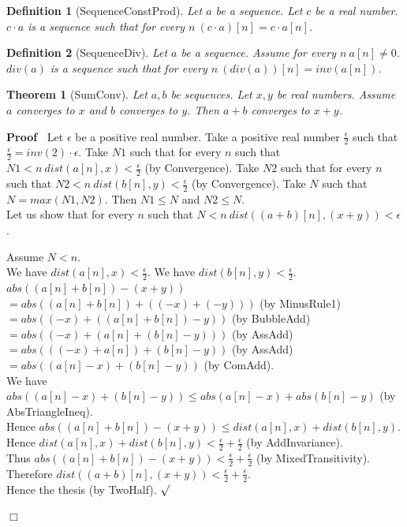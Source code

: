 \documentclass{article}
\newenvironment{forthel}{\begin{leftbar}}{\end{leftbar}}
\newenvironment{proof}{\noindent\textbf{Proof\ }}{\hspace*{\fill}$\Box$\medskip}
\newenvironment{subproof}{\begin{list}{}{}
		\item[\text{Proof}]}{\hfill $\surd$ \end{list}}
\newtheorem{theorem}{Theorem}
\newtheorem{definition}{Definition}
\newcommand{\cdottwo}{\cdot}
\newcommand{\plusone}{+}
\newcommand{\halfeps}{\frac{\epsilon}{2}}
\newcommand{\dotequal}{=}
\begin{document}
\begin{forthel}
	\begin{definition}[SequenceConstProd]
	Let $a$ be a sequence. Let $c$ be a real number. $c \cdottwo a$ is a sequence such that for every $n \ (c \cdottwo a)[n] = c \cdot a[n]$.
	\end{definition}

	\begin{definition}[SequenceDiv]
	Let $a$ be a sequence. Assume for every $n \ a[n] \neq 0$. $div(a)$ is a sequence such that for every $n \ (div(a))[n] = inv(a[n])$.
	\end{definition}
	
	\begin{theorem}[SumConv]
	Let $a,b$ be sequences. Let $x,y$ be real numbers. Assume $a$ converges to $x$ and $b$ converges to $y$.
	Then $a \plusone b$ converges to $x + y$.
	\end{theorem}
	\begin{proof}
	Let $\epsilon$ be a positive real number.
	Take a positive real number $\halfeps$ such that $\halfeps = inv(2) \cdot \epsilon$.
	Take $N1$ such that for every $n$ such that $N1 < n \ dist(a[n],x) < \halfeps$ (by Convergence).
	Take $N2$ such that for every $n$ such that $N2 < n \ dist(b[n],y) < \halfeps$ (by Convergence).
	Take $N$ such that $N = max(N1,N2)$.
	Then $N1 \leq N$ and $N2 \leq N$.
	\\Let us show that for every $n$ such that $N < n \ dist((a \plusone b)[n],(x+y)) < \epsilon$.
	\begin{subproof}
	Assume $N < n$.
	\\We have $dist(a[n],x) < \halfeps$.
	We have $dist(b[n],y) < \halfeps$.
	\\$abs((a[n] + b[n]) - (x + y))$ 
	\\$\dotequal abs((a[n] + b[n]) + ((-x) + (-y)))$ (by MinusRule1)
	\\$\dotequal abs((-x) + ((a[n] + b[n]) - y))$ (by BubbleAdd)
	\\$\dotequal abs((-x) + (a[n] + (b[n] - y)))$ (by AssAdd)
	\\$\dotequal abs(((-x) + a[n]) + (b[n] - y))$ (by AssAdd)
	\\$\dotequal abs((a[n] - x) + (b[n] - y))$ (by ComAdd).
	\\We have $abs((a[n] - x) + (b[n] - y)) \leq abs(a[n] - x) + abs(b[n] - y)$  (by AbsTriangleIneq).
	\\Hence $abs((a[n] + b[n]) - (x + y)) \leq dist(a[n],x) + dist(b[n],y)$.
	\\Hence $dist(a[n],x) + dist(b[n],y) < \halfeps + \halfeps$ (by AddInvariance).
	\\Thus $abs((a[n] + b[n]) - (x + y)) < \halfeps + \halfeps$ (by MixedTransitivity).
	\\Therefore $dist((a \plusone b)[n],(x + y)) < \halfeps + \halfeps$.
	\\Hence the thesis (by TwoHalf).
	\end{subproof}
	\end{proof}
	

\end{forthel}
\end{document}
